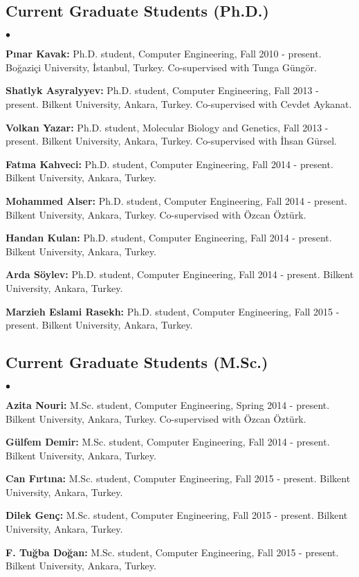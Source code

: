 \documentclass[margin,line]{res}
\newenvironment{list2}{
  \begin{list}{$\bullet$}{%
      \setlength{\itemsep}{0in}
      \setlength{\parsep}{0in} \setlength{\parskip}{0in}
      \setlength{\topsep}{0in} \setlength{\partopsep}{0in} 
      \setlength{\leftmargin}{0.2in}}}{\end{list}}
\begin{document}
\begin{resume}
\subsection{\small \sc Current Graduate Students (Ph.D.)}
\begin{list2}
\item
  {\bf P{\i}nar Kavak:} Ph.D. student, Computer Engineering, Fall 2010 - present.
  Bo\u{g}azi\c{c}i University, \.{I}stanbul, Turkey. Co-supervised with Tunga G\"{u}ng\"{o}r.
\item
  {\bf Shatlyk Asyralyyev:} Ph.D. student, Computer Engineering, Fall 2013 - present.
  Bilkent University, Ankara, Turkey. Co-supervised with Cevdet Aykanat.
\item
  {\bf Volkan Yazar:} Ph.D. student, Molecular Biology and Genetics, Fall 2013 - present.
  Bilkent University, Ankara, Turkey. Co-supervised with İhsan Gürsel.
\item
  {\bf Fatma Kahveci:} Ph.D. student, Computer Engineering, Fall 2014 - present.
  Bilkent University, Ankara, Turkey.
\item
  {\bf Mohammed Alser:} Ph.D. student, Computer Engineering, Fall 2014 - present.
  Bilkent University, Ankara, Turkey. Co-supervised with Özcan Öztürk.
\item
  {\bf Handan Kulan:} Ph.D. student, Computer Engineering, Fall 2014 - present.
  Bilkent University, Ankara, Turkey. 
\item
  {\bf Arda Söylev:} Ph.D. student, Computer Engineering, Fall 2014 - present.
  Bilkent University, Ankara, Turkey. 
\item
  {\bf Marzieh Eslami Rasekh:} Ph.D. student, Computer Engineering, Fall 2015 - present.
  Bilkent University, Ankara, Turkey. 
\end{list2}
\vspace*{-.4cm}
\subsection{\small \sc Current Graduate Students (M.Sc.)}
\begin{list2}
\item
  {\bf Azita Nouri:} M.Sc. student, Computer Engineering, Spring 2014 - present.
  Bilkent University, Ankara, Turkey. Co-supervised with Özcan Öztürk.
\item
  {\bf Gülfem Demir:} M.Sc. student, Computer Engineering, Fall 2014 - present.
  Bilkent University, Ankara, Turkey. 
\item
  {\bf Can Fırtına:} M.Sc. student, Computer Engineering, Fall 2015 - present.
  Bilkent University, Ankara, Turkey. 
\item
  {\bf Dilek Genç:} M.Sc. student, Computer Engineering, Fall 2015 - present.
  Bilkent University, Ankara, Turkey. 
\item
  {\bf F. Tuğba Doğan:} M.Sc. student, Computer Engineering, Fall 2015 - present.
  Bilkent University, Ankara, Turkey. 
\end{list2}


\end{resume}
\end{document}
